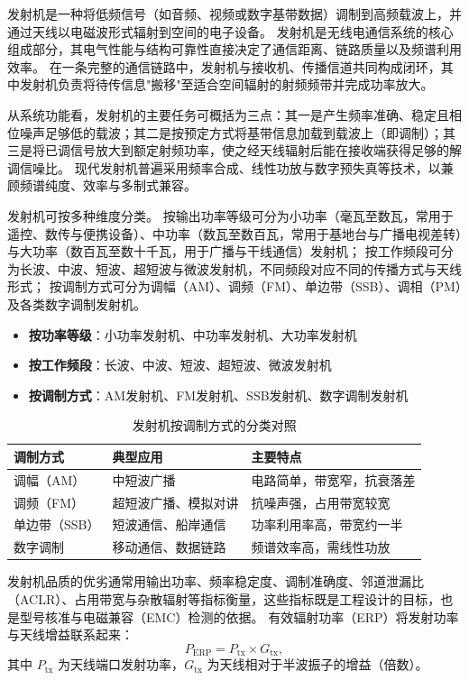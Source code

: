 发射机是一种将低频信号（如音频、视频或数字基带数据）调制到高频载波上，并通过天线以电磁波形式辐射到空间的电子设备。
发射机是无线电通信系统的核心组成部分，其电气性能与结构可靠性直接决定了通信距离、链路质量以及频谱利用效率。
在一条完整的通信链路中，发射机与接收机、传播信道共同构成闭环，其中发射机负责将待传信息"搬移"至适合空间辐射的射频频带并完成功率放大。

从系统功能看，发射机的主要任务可概括为三点：其一是产生频率准确、稳定且相位噪声足够低的载波；其二是按预定方式将基带信息加载到载波上（即调制）；其三是将已调信号放大到额定射频功率，使之经天线辐射后能在接收端获得足够的解调信噪比。
现代发射机普遍采用频率合成、线性功放与数字预失真等技术，以兼顾频谱纯度、效率与多制式兼容。

发射机可按多种维度分类。
按输出功率等级可分为小功率（毫瓦至数瓦，常用于遥控、数传与便携设备）、中功率（数瓦至数百瓦，常用于基地台与广播电视差转）与大功率（数百瓦至数十千瓦，用于广播与干线通信）发射机；
按工作频段可分为长波、中波、短波、超短波与微波发射机，不同频段对应不同的传播方式与天线形式；
按调制方式可分为调幅（AM）、调频（FM）、单边带（SSB）、调相（PM）及各类数字调制发射机。

\begin{itemize}
    \item \textbf{按功率等级}：小功率发射机、中功率发射机、大功率发射机
    \item \textbf{按工作频段}：长波、中波、短波、超短波、微波发射机
    \item \textbf{按调制方式}：AM发射机、FM发射机、SSB发射机、数字调制发射机
\end{itemize}

\begin{table}[htbp]
\centering
\caption{发射机按调制方式的分类对照}
\label{tab:tx_classification}
\begin{tabular}{|p{3.2cm}|p{4.3cm}|p{5cm}|}
\hline
\textbf{调制方式} & \textbf{典型应用} & \textbf{主要特点} \\
\hline
调幅（AM） & 中短波广播 & 电路简单，带宽窄，抗衰落差 \\
\hline
调频（FM） & 超短波广播、模拟对讲 & 抗噪声强，占用带宽较宽 \\
\hline
单边带（SSB） & 短波通信、船岸通信 & 功率利用率高，带宽约一半 \\
\hline
数字调制 & 移动通信、数据链路 & 频谱效率高，需线性功放 \\
\hline
\end{tabular}
\end{table}

发射机品质的优劣通常用输出功率、频率稳定度、调制准确度、邻道泄漏比（ACLR）、占用带宽与杂散辐射等指标衡量，这些指标既是工程设计的目标，也是型号核准与电磁兼容（EMC）检测的依据。
有效辐射功率（ERP）将发射功率与天线增益联系起来：
\begin{equation}
P_{\mathrm{ERP}} = P_{\mathrm{tx}} \times G_{\mathrm{tx}},
\end{equation}
其中 $P_{\mathrm{tx}}$ 为天线端口发射功率，$G_{\mathrm{tx}}$ 为天线相对于半波振子的增益（倍数）。

